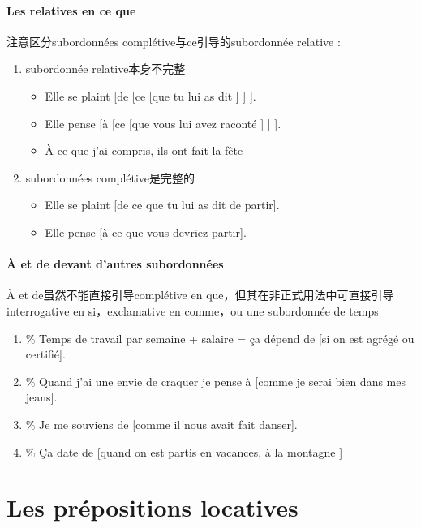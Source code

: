\documentclass[UTF8]{report}
\begin{document}
\paragraph{Les relatives en ce que}
注意区分subordonnées complétive与ce引导的subordonnée relative :
\begin{enumerate}
    \item subordonnée relative本身不完整
    \begin{itemize}
        \item Elle se plaint [de [ce [que tu lui as dit ] ] ].
        \item Elle pense [à [ce [que vous lui avez raconté ] ] ].
        \item À ce que j’ai compris, ils ont fait la fête
    \end{itemize}
    \item subordonnées complétive是完整的
    \begin{itemize}
        \item Elle se plaint [de ce que tu lui as dit de partir].
        \item Elle pense [à ce que vous devriez partir].
    \end{itemize}
\end{enumerate}

\paragraph{À et de devant d’autres subordonnées}
À et de虽然不能直接引导complétive en que，但其在非正式用法中可直接引导interrogative en si，exclamative en comme，ou une subordonnée de temps 
\begin{enumerate}
    \item \% Temps de travail par semaine + salaire = ça dépend de [si on est agrégé ou certifié]. 
    \item \% Quand j’ai une envie de craquer je pense à [comme je serai bien dans mes jeans]. 
    \item \% Je me souviens de [comme il nous avait fait danser].
    \item \% Ça date de [quand on est partis en vacances, à la montagne ]
\end{enumerate}

\section{Les prépositions locatives}
\end{document}
